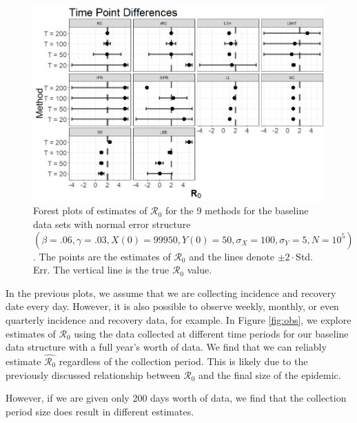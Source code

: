 \documentclass[12pt]{article}
\newcommand{\xxsir}{\ensuremath{9} } %
\newcommand{\rr}{\ensuremath{\mathcal{R}_0}}
\begin{document}
\begin{figure}[H]
	\centering
	\includegraphics[scale=0.5]{images/timediff.jpg}
	\caption{Forest plots of estimates of $\rr$ for the \xxsir methods for the baseline data sets with normal error structure $(\beta=.06, \gamma=.03, X(0) = 99950, Y(0)=50, \sigma_X=100, \sigma_Y=5, N=10^5)$.  The points are the estimates of $\rr$ and the lines denote $\pm 2\cdot $Std. Err.  The vertical line is the true $\rr$ value.}\label{fig:timediff}
      \end{figure}

      In the previous plots, we assume that we are collecting incidence and recovery date every day.  However, it is also possible to observe weekly, monthly, or even quarterly incidence and recovery data, for example.  In Figure \ref{fig:obs}, we explore estimates of $\rr$ using the data collected at different time periods for our baseline data structure with a full year's worth of data.  We find that we can reliably estimate $\hat{\rr}$ regardless of the collection period.  This is likely due to the previously discussed relationship between $\rr$ and the final size of the epidemic. 

However, if we are given only 200 days worth of data, we find that the collection period size does result in different estimates.    
      
\end{document}
